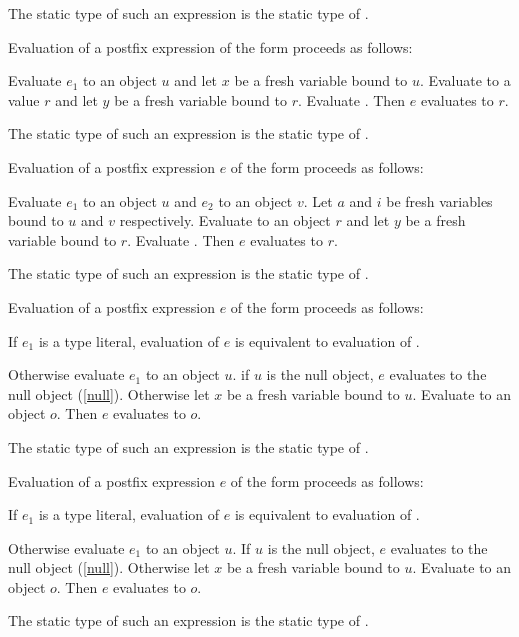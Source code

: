\documentclass{article}
\begin{document}
\LMHash{}
The static type of such an expression is the static type of .

\LMHash{}
Evaluation of a postfix expression of the form 
proceeds as follows:

\LMHash{}
Evaluate $e_1$ to an object $u$ and let $x$ be a fresh variable bound to $u$.
Evaluate  to a value $r$
and let $y$ be a fresh variable bound to $r$.
Evaluate .
Then $e$ evaluates to $r$.

\LMHash{}
The static type of such an expression is the static type of .

\LMHash{}
Evaluation of a postfix expression $e$ of the form 
proceeds as follows:

\LMHash{}
Evaluate $e_1$ to an object $u$ and $e_2$ to an object $v$.
Let $a$ and $i$ be fresh variables bound to $u$ and $v$ respectively.
Evaluate  to an object $r$
and let $y$ be a fresh variable bound to $r$.
Evaluate .
Then $e$ evaluates to $r$.

\LMHash{}
The static type of such an expression is the static type of .

\LMHash{}
Evaluation of a postfix expression $e$ of the form 
proceeds as follows:

\LMHash{}
If $e_1$ is a type literal, evaluation of $e$ is equivalent to
evaluation of .

\LMHash{}
Otherwise evaluate $e_1$ to an object $u$.
if $u$ is the null object, $e$ evaluates to the null object (\ref{null}).
Otherwise let $x$ be a fresh variable bound to $u$.
Evaluate  to an object $o$.
Then $e$ evaluates to $o$.

\LMHash{}
The static type of such an expression is the static type of .

\LMHash{}
Evaluation of a postfix expression $e$ of the form 
proceeds as follows:

If $e_1$ is a type literal, evaluation of $e$ is equivalent to
evaluation of .

Otherwise evaluate $e_1$ to an object $u$.
If $u$ is the null object, $e$ evaluates to the null object (\ref{null}).
Otherwise let $x$ be a fresh variable bound to $u$.
Evaluate  to an object $o$.
Then $e$ evaluates to $o$.

\LMHash{}
The static type of such an expression is the static type of .
\end{document}
